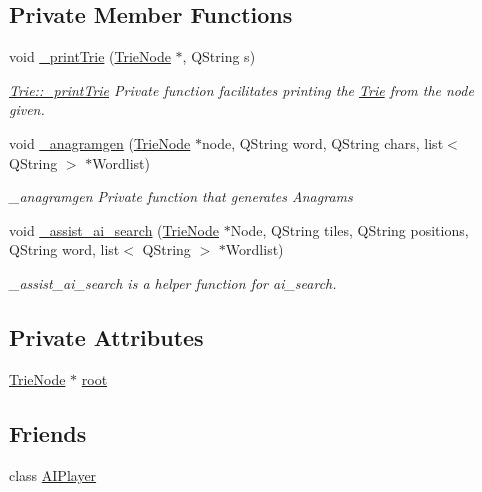 \subsection*{Private Member Functions}
\begin{DoxyCompactItemize}
\item 
void \hyperlink{class_trie_a8fae6ad56c2bb54b80f898a43d183196}{\-\_\-print\-Trie} (\hyperlink{class_trie_node}{Trie\-Node} $\ast$, Q\-String s)
\begin{DoxyCompactList}\small\item\em \hyperlink{class_trie_a8fae6ad56c2bb54b80f898a43d183196}{Trie\-::\-\_\-print\-Trie} Private function facilitates printing the \hyperlink{class_trie}{Trie} from the node given. \end{DoxyCompactList}\item 
void \hyperlink{class_trie_aa61239097f40f1f36ea3b346e583ad01}{\-\_\-anagramgen} (\hyperlink{class_trie_node}{Trie\-Node} $\ast$node, Q\-String word, Q\-String chars, list$<$ Q\-String $>$ $\ast$Wordlist)
\begin{DoxyCompactList}\small\item\em \-\_\-anagramgen Private function that generates Anagrams \end{DoxyCompactList}\item 
void \hyperlink{class_trie_af906dedaa7c21cfee69043230b453446}{\-\_\-assist\-\_\-ai\-\_\-search} (\hyperlink{class_trie_node}{Trie\-Node} $\ast$Node, Q\-String tiles, Q\-String positions, Q\-String word, list$<$ Q\-String $>$ $\ast$Wordlist)
\begin{DoxyCompactList}\small\item\em \-\_\-assist\-\_\-ai\-\_\-search is a helper function for ai\-\_\-search. \end{DoxyCompactList}\end{DoxyCompactItemize}
\subsection*{Private Attributes}
\begin{DoxyCompactItemize}
\item 
\hyperlink{class_trie_node}{Trie\-Node} $\ast$ \hyperlink{class_trie_a052cecab75ca88758778d340ed002d66}{root}
\end{DoxyCompactItemize}
\subsection*{Friends}
\begin{DoxyCompactItemize}
\item 
class \hyperlink{class_trie_a2c11a076a909acd936d897cd2a81f931}{A\-I\-Player}
\end{DoxyCompactItemize}


